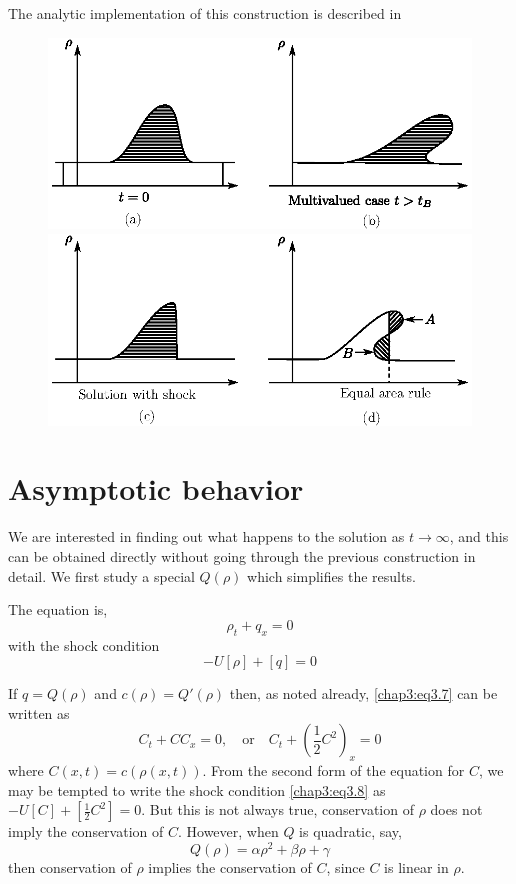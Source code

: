 The analytic implementation of this construction is described in \cite{key1}
\begin{figure}[H]
\centering
\includegraphics{figures/fig61-3.2ab.eps}
\medskip
\includegraphics{figures/fig61-3.2cd.eps}
\caption{}
\label{chap1:fig3.2}
\end{figure}

\section{Asymptotic behavior}\pageoriginale \label{chap3:sec3.3}

We are interested in finding out what happens to the solution as $t\to \infty$, and this can be obtained directly without going through the previous construction in detail. We first study a special $Q(\rho)$ which simplifies the results.

The equation is,
\begin{equation}
\rho_t + q_x=0\tag{3.7}\label{chap3:eq3.7}
\end{equation}
with the shock condition
\begin{equation}
-U[\rho]+[q]=0\tag{3.8}\label{chap3:eq3.8}
\end{equation}

If $q=Q(\rho)$ and $c(\rho)=Q'(\rho)$ then, as noted already, \eqref{chap3:eq3.7} can be written as 
$$
C_t +CC_x=0,\quad\text{or}\quad C_t +\left(\frac{1}{2}C^2\right)_x=0
$$
where $C(x,t)=c(\rho(x,t))$. From the second form of the equation for $C$, we may be tempted to write the shock condition \eqref{chap3:eq3.8} as $-U[C]+[\frac{1}{2}C^2]=0$. But this is not always true, \ie conservation of $\rho$ does not imply the conservation of $C$. However, when $Q$ is quadratic, say,
$$
Q(\rho)=\alpha\rho^2 +\beta\rho +\gamma
$$
then conservation of $\rho$ implies the conservation of $C$, since $C$ is linear in $\rho$.

